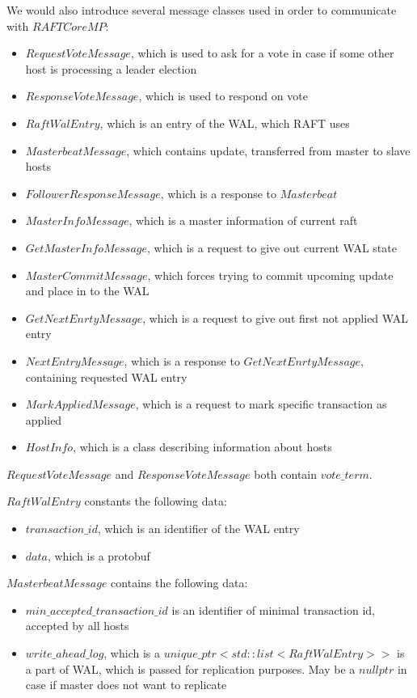 \documentclass{article}
\begin{document}
We would also introduce several message classes used in order to communicate with $RAFTCoreMP$:
\begin{itemize}
	\item $RequestVoteMessage$, which is used to ask for a vote in case if some other host is processing a leader election
	\item $ResponseVoteMessage$, which is used to respond on vote
	\item $RaftWalEntry$, which is an entry of the WAL, which RAFT uses
	\item $MasterbeatMessage$, which contains update, transferred from master to slave hosts
	\item $FollowerResponseMessage$, which is a response to $Masterbeat$
	\item $MasterInfoMessage$, which is a master information of current raft
	\item $GetMasterInfoMessage$, which is a request to give out current WAL state
	\item $MasterCommitMessage$, which forces trying to commit upcoming update and place in to the WAL
	\item $GetNextEnrtyMessage$, which is a request to give out first not applied WAL entry
	\item $NextEntryMessage$, which is a response to $GetNextEnrtyMessage$, containing requested WAL entry
	\item $MarkAppliedMessage$, which is a request to mark specific transaction as applied
	\item $HostInfo$, which is a class describing information about hosts
\end{itemize}

$RequestVoteMessage$ and $ResponseVoteMessage$ both contain $vote\_term$.

$RaftWalEntry$ constants the following data:
\begin{itemize}
	\item $transaction\_id$, which is an identifier of the WAL entry
	\item $data$, which is a protobuf
\end{itemize}

$MasterbeatMessage$ contains the following data:
\begin{itemize}
	\item $min\_accepted\_transaction\_id$ is an identifier of minimal transaction id, accepted by all hosts
	\item $write\_ahead\_log$, which is a $unique\_ptr<std::list<RaftWalEntry>>$ is a part of WAL, which is passed for replication purposes. May be a $nullptr$ in case if master does not want to replicate
\end{itemize}
\end{document}
